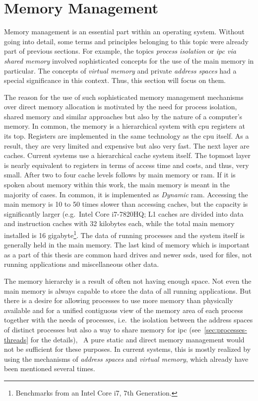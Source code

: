 \section{Memory Management}\label{sec:memory-management}
Memory management is an essential part within an operating system.
Without going into detail, some terms and principles belonging to this topic were already part of previous sections.
For example, the topics \textit{process isolation} or \textit{\ac{ipc} via shared memory} involved sophisticated concepts for the use of the main memory in particular.
The concepts of \textit{virtual memory} and private \textit{address spaces} had a special significance in this context.
Thus, this section will focus on them.

The reason for the use of such sophisticated memory management mechanisms over direct memory allocation is motivated by the need for process isolation, shared memory and similar approaches but also by the nature of a computer's memory.
In common, the memory is a hierarchical system with \ac{cpu} registers at its top.
Registers are implemented in the same technology as the \ac{cpu} itself. 
As a result, they are very limited and expensive but also very fast.
The next layer are caches.
Current systems use a hierarchical cache system itself.
The topmost layer is nearly equivalent to registers in terms of access time and costs, and thus, very small.
After two to four cache levels follows by main memory or \ac{ram}.
If it is spoken about memory within this work, the main memory is meant in the majority of cases.
In common, it is implemented as \textit{Dynamic} \ac{ram}.
Accessing the main memory is 10 to 50 times slower than accessing caches, but the capacity is significantly larger (e.g.\ Intel Core i7-7820HQ; L1 caches are divided into data and instruction caches with 32 kilobytes each, while the total main memory installed is 16 gigabyte\footnote{Benchmarks from an Intel Core i7, 7th Generation.}\cite{mandl2014Grundkurs}.
The data of running processes and the system itself is generally held in the main memory.
The last kind of memory which is important as a part of this thesis are common hard drives and newer \acp{ssd}, used for files, not running applications and miscellaneous other data.

The memory hierarchy is a result of often not having enough space.
Not even the main memory is always capable to store the data of all running applications. 
But there is a desire for allowing processes to use more memory than physically available and for a unified contiguous view of the memory area of each process together with the needs of processes, i.e.\ the isolation between the address spaces of distinct processes but also a way to share memory for \ac{ipc} (see~\ref{sec:processes-threads} for the details)\cite{mandl2014Grundkurs},~\cite{brause2017betriebssysteme}
A pure static and direct memory management would not be sufficient for these purposes.
In current systems, this is mostly realized by using the mechanisms of \textit{address spaces} and \textit{virtual memory}, which already have been mentioned several times.


